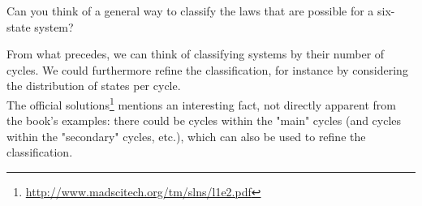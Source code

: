 \documentclass[solutions.tex]{subfiles}
\begin{document}
\maketitle
\begin{exercise}
Can you think of a general way to classify the laws
that are possible for a six-state system?
\end{exercise}
From what precedes, we can think of classifying systems
by their number of cycles. We could furthermore refine
the classification, for instance by considering the
distribution of states per cycle. \\

The official solutions\footnote{\url{http://www.madscitech.org/tm/slns/l1e2.pdf}}
mentions an interesting fact, not directly apparent from the book's
examples: there could be cycles within the "main" cycles (and cycles
within the "secondary" cycles, etc.), which can also be used to refine
the classification.
\end{document}

